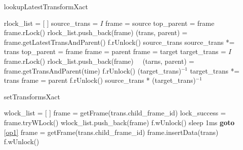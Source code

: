 \documentclass[a4paper]{jreport}	%
\begin{document}
\begin{algorithm}
  \caption{lookupLatestTransformXact}\label{algo:lookupLatestTransformXact}
\begin{algorithmic}[1]
	\State rlock\_list = [ ]
	\State source\_trans = $I$
	\State frame = source
	\State top\_parent = frame
   \State frame.rLock()
	\State rlock\_list.push\_back(frame)  \label{code:lookupXact-add}
	\State (trans, parent) = frame.getLatestTransAndParent() 
	 
	\State f.rUnlock()
	\EndFor
	\State \Return source\_trans
	\EndIf
	\State source\_trans *= trans
	\State top\_parent = frame
	\State frame = parent
	\EndWhile
	\State frame = target
	\State target\_trans = $I$
   \State frame.rLock()	
	\State rlock\_list.push\_back(frame)　
	\State (tarns, parent) = frame.getTransAndParent(time)
	 
	\State f.rUnlock()
	\EndFor
	\State \Return (target\_trans)$^{-1}$
	\EndIf
	\State target\_trans *= trans
	\State frame = parent
	\EndWhile
    \label{code:lookupXact-unlockall}  
   \State f.rUnlock()
   \EndFor	
	\State \Return source\_trans * (target\_trans)$^{-1}$
	\EndFunction
\end{algorithmic}
\end{algorithm}


\begin{algorithm}
\caption{setTransformsXact}\label{algo:setTransformsXact}
\begin{algorithmic}[1]
	\State wlock\_list = [ ] \label{op1}
	\State frame = getFrame(trans.child\_frame\_id)
	\State lock\_success = frame.tryWLock()  \label{code:setXact-trylock}
	\State wlock\_list.push\_back(frame)
	\Else
	 \label{code:setXact-unlockall}  
   \State f.wUnlock()
   \EndFor
	\State sleep 1ms 
	\State \textbf{goto} \ref{op1} 
	\EndIf
	\EndFor
	 
	\State frame = getFrame(trans.child\_frame\_id)
	\State frame.insertData(trans)
	\EndFor
	 
   \State f.wUnlock()
   \EndFor
	\EndProcedure
\end{algorithmic}
\end{algorithm}
\end{document}
